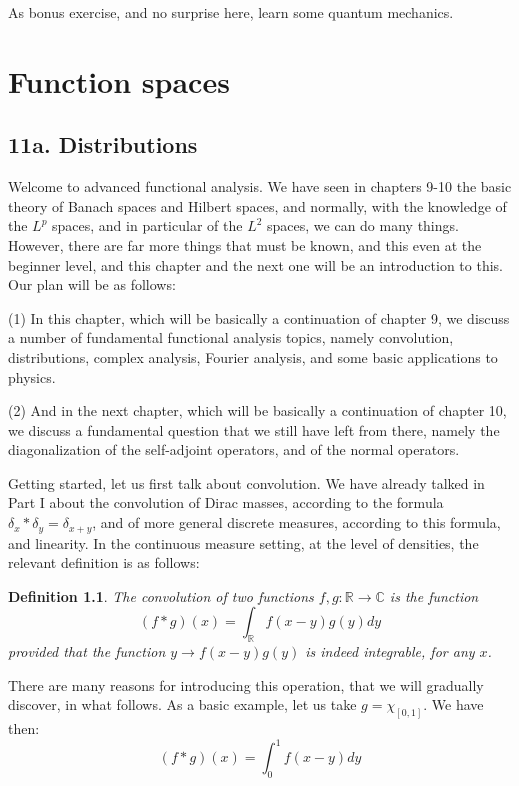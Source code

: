 \documentclass[12pt]{amsbook}
\newtheorem{definition}[theorem]{Definition}
\begin{document}
As bonus exercise, and no surprise here, learn some quantum mechanics.

\chapter{Function spaces}

\section*{11a. Distributions}

Welcome to advanced functional analysis. We have seen in chapters 9-10 the basic theory of Banach spaces and Hilbert spaces, and normally, with the knowledge of the $L^p$ spaces, and in particular of the $L^2$ spaces, we can do many things. However, there are far more things that must be known, and this even at the beginner level, and this chapter and the next one will be an introduction to this. Our plan will be as follows:

\bigskip

(1) In this chapter, which will be basically a continuation of chapter 9, we discuss a number of fundamental functional analysis topics, namely convolution, distributions, complex analysis,  Fourier analysis, and some basic applications to physics.

\bigskip

(2) And in the next chapter, which will be basically a continuation of chapter 10, we discuss a fundamental question that we still have left from there, namely the diagonalization of the self-adjoint operators, and of the normal operators.

\bigskip

Getting started, let us first talk about convolution. We have already talked in Part I about the convolution of Dirac masses, according to the formula $\delta_x*\delta_y=\delta_{x+y}$, and of more general discrete measures, according to this formula, and linearity. In the continuous measure setting, at the level of densities, the relevant definition is as follows:


\begin{definition}
The convolution of two functions $f,g:\mathbb R\to\mathbb C$ is the function
$$(f*g)(x)=\int_\mathbb R f(x-y)g(y)dy$$
provided that the function $y\to f(x-y)g(y)$ is indeed integrable, for any $x$.
\end{definition}

There are many reasons for introducing this operation, that we will gradually discover, in what follows. As a basic example, let us take $g=\chi_{[0,1]}$. We have then:
$$(f*g)(x)=\int_0^1f(x-y)dy$$
\end{document}

